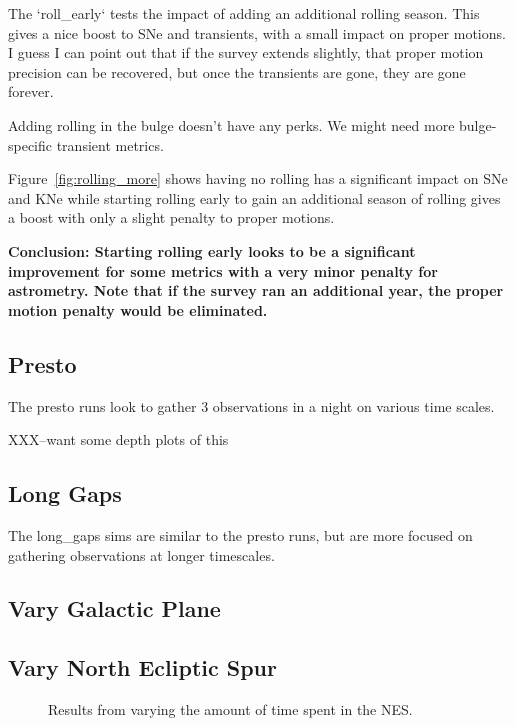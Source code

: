 The `roll\_early` tests the impact of adding an additional rolling season. This gives a nice boost to SNe and transients, with a small impact on proper motions. I guess I can point out that if the survey extends slightly, that proper motion precision can be recovered, but once the transients are gone, they are gone forever.

Adding rolling in the bulge doesn't have any perks. We might need more bulge-specific transient metrics.


Figure~\ref{fig:rolling_more} shows having no rolling has a significant impact on SNe and KNe while starting rolling early to gain an additional season of rolling gives a boost with only a slight penalty to proper motions. 

{\bf Conclusion: Starting rolling early looks to be a significant improvement for some metrics with a very minor penalty for astrometry. Note that if the survey ran an additional year, the proper motion penalty would be eliminated. }


\subsection{Presto}

The presto runs look to gather 3 observations in a night on various time scales.

XXX--want some depth plots of this

\subsection{Long Gaps}

The long\_gaps sims are similar to the presto runs, but are more focused on gathering observations at longer timescales.

\subsection{Vary Galactic Plane}



\subsection{Vary North Ecliptic Spur}

\begin{figure}
\caption{Results from varying the amount of time spent in the NES. \label{fig:vary_nes}}
\end{figure}

